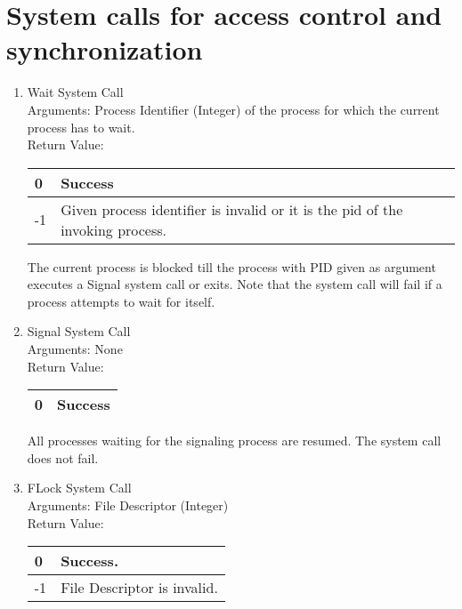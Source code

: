 \section{System calls for access control and synchronization}
\begin{enumerate}
\item{Wait System Call}
\\
Arguments: Process Identifier (Integer) of the process for which the current process has to wait.\\
Return Value:
\FloatBarrier \begin{table}[H]
\centering
\begin{tabular}{|l|l|}
\hline
0	& Success \\ \hline
-1	& Given process identifier is invalid or it is the pid of the invoking process. \\ \hline
\end{tabular}
\end{table} \FloatBarrier 

The current process is blocked till the process with PID given as argument executes a Signal system call or exits. Note that the system call will fail if a process attempts to wait for itself.  

\item{Signal System Call}
\\
Arguments: None\\
Return Value:
\FloatBarrier \begin{table}[H]
\centering
\begin{tabular}{|l|l|}
\hline
0	& Success \\ \hline
\end{tabular}
\end{table} \FloatBarrier 

All processes waiting for the signaling process are resumed. The system call does not fail.


\item{FLock System Call}
\\
Arguments: File Descriptor (Integer)\\
Return Value:
\FloatBarrier \begin{table}[H]
\centering
\begin{tabular}{|l|l|}
\hline
0	& Success. \\ \hline
-1	& File Descriptor is invalid. \\ \hline
\end{tabular}
\end{table} \FloatBarrier 


\end{enumerate}
